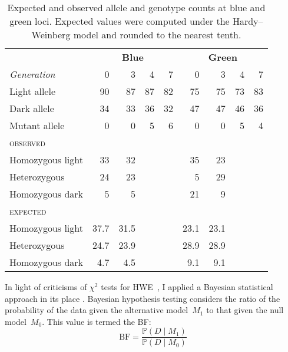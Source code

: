 \documentclass{article}
\begin{document}
    \begin{table}
        \centering
        \caption{Expected and observed allele and genotype counts at blue and
                     green loci.
                 Expected values were computed under the Hardy--Weinberg
                     model and rounded to the nearest tenth.}
        \begin{tabular}{l r r r r r r r r}
            \toprule
            & \multicolumn{4}{c}{\textbf{Blue}}
                & \multicolumn{4}{c}{\textbf{Green}} \\
            \emph{Generation} & 0 & 3 & 4 & 7 & 0 & 3 & 4 & 7 \\
            \midrule
            Light allele & 90 & 87 & 87 & 82 & 75 & 75 & 73 & 83 \\
            Dark allele & 34 & 33 & 36 & 32 & 47 & 47 & 46 & 36 \\
            Mutant allele & 0 & 0 & 5 & 6 & 0 & 0 & 5 & 4 \\
            \midrule
            \textsc{observed} \\
            Homozygous light & 33 & 32 & & & 35 & 23 \\
            Heterozygous & 24 & 23 & & & 5 & 29 \\
            Homozygous dark & 5 & 5 & & & 21 & 9 \\
            \midrule
            \textsc{expected} \\
            Homozygous light & 37.7 & 31.5 & & & 23.1 & 23.1 \\
            Heterozygous & 24.7 & 23.9 & & & 28.9 & 28.9 \\
            Homozygous dark & 4.7 & 4.5 & & & 9.1 & 9.1 \\
            \bottomrule
        \end{tabular}
    \end{table}

    In light of criticisms of $\chi^2$ tests for \ac{HWE}~\cite{WCA05}, I
        applied a Bayesian statistical approach in its place \cite{CMV11}.
    Bayesian hypothesis testing considers the ratio of the probability of the
        data given the alternative model~$M_1$ to that given the null
        model~$M_0$.
    This value is termed the \ac{BF}:
    \begin{equation}
        \text{BF} = \frac{\mathbb{P}\left(D\mid M_1\right)}
                         {\mathbb{P}\left(D\mid M_0\right)}
    \end{equation}
\end{document}
